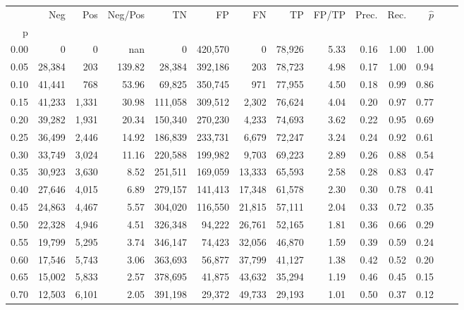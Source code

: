 \begin{tabular}{rrrrrrrrrrrrrr}
\toprule
{} &     Neg &    Pos & Neg/Pos &       TN &       FP &      FN &      TP & FP/TP & Prec. &  Rec. & $\hat{p}$ \\
p    &         &        &         &          &          &         &         &       &       &       &           \\
\midrule
0.00 &       0 &      0 &     nan &        0 &  420,570 &       0 &  78,926 &  5.33 &  0.16 &  1.00 &      1.00 \\
0.05 &  28,384 &    203 &  139.82 &   28,384 &  392,186 &     203 &  78,723 &  4.98 &  0.17 &  1.00 &      0.94 \\
0.10 &  41,441 &    768 &   53.96 &   69,825 &  350,745 &     971 &  77,955 &  4.50 &  0.18 &  0.99 &      0.86 \\
0.15 &  41,233 &  1,331 &   30.98 &  111,058 &  309,512 &   2,302 &  76,624 &  4.04 &  0.20 &  0.97 &      0.77 \\
0.20 &  39,282 &  1,931 &   20.34 &  150,340 &  270,230 &   4,233 &  74,693 &  3.62 &  0.22 &  0.95 &      0.69 \\
0.25 &  36,499 &  2,446 &   14.92 &  186,839 &  233,731 &   6,679 &  72,247 &  3.24 &  0.24 &  0.92 &      0.61 \\
0.30 &  33,749 &  3,024 &   11.16 &  220,588 &  199,982 &   9,703 &  69,223 &  2.89 &  0.26 &  0.88 &      0.54 \\
0.35 &  30,923 &  3,630 &    8.52 &  251,511 &  169,059 &  13,333 &  65,593 &  2.58 &  0.28 &  0.83 &      0.47 \\
0.40 &  27,646 &  4,015 &    6.89 &  279,157 &  141,413 &  17,348 &  61,578 &  2.30 &  0.30 &  0.78 &      0.41 \\
0.45 &  24,863 &  4,467 &    5.57 &  304,020 &  116,550 &  21,815 &  57,111 &  2.04 &  0.33 &  0.72 &      0.35 \\
0.50 &  22,328 &  4,946 &    4.51 &  326,348 &   94,222 &  26,761 &  52,165 &  1.81 &  0.36 &  0.66 &      0.29 \\
0.55 &  19,799 &  5,295 &    3.74 &  346,147 &   74,423 &  32,056 &  46,870 &  1.59 &  0.39 &  0.59 &      0.24 \\
0.60 &  17,546 &  5,743 &    3.06 &  363,693 &   56,877 &  37,799 &  41,127 &  1.38 &  0.42 &  0.52 &      0.20 \\
0.65 &  15,002 &  5,833 &    2.57 &  378,695 &   41,875 &  43,632 &  35,294 &  1.19 &  0.46 &  0.45 &      0.15 \\
0.70 &  12,503 &  6,101 &    2.05 &  391,198 &   29,372 &  49,733 &  29,193 &  1.01 &  0.50 &  0.37 &      0.12 \\

\end{tabular}
